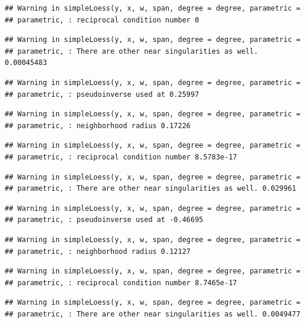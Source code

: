 \documentclass[]{article}
\begin{document}
\begin{verbatim}
## Warning in simpleLoess(y, x, w, span, degree = degree, parametric =
## parametric, : reciprocal condition number 0
\end{verbatim}

\begin{verbatim}
## Warning in simpleLoess(y, x, w, span, degree = degree, parametric =
## parametric, : There are other near singularities as well. 0.00045483
\end{verbatim}

\begin{verbatim}
## Warning in simpleLoess(y, x, w, span, degree = degree, parametric =
## parametric, : pseudoinverse used at 0.25997
\end{verbatim}

\begin{verbatim}
## Warning in simpleLoess(y, x, w, span, degree = degree, parametric =
## parametric, : neighborhood radius 0.17226
\end{verbatim}

\begin{verbatim}
## Warning in simpleLoess(y, x, w, span, degree = degree, parametric =
## parametric, : reciprocal condition number 8.5783e-17
\end{verbatim}

\begin{verbatim}
## Warning in simpleLoess(y, x, w, span, degree = degree, parametric =
## parametric, : There are other near singularities as well. 0.029961
\end{verbatim}

\begin{verbatim}
## Warning in simpleLoess(y, x, w, span, degree = degree, parametric =
## parametric, : pseudoinverse used at -0.46695
\end{verbatim}

\begin{verbatim}
## Warning in simpleLoess(y, x, w, span, degree = degree, parametric =
## parametric, : neighborhood radius 0.12127
\end{verbatim}

\begin{verbatim}
## Warning in simpleLoess(y, x, w, span, degree = degree, parametric =
## parametric, : reciprocal condition number 8.7465e-17
\end{verbatim}

\begin{verbatim}
## Warning in simpleLoess(y, x, w, span, degree = degree, parametric =
## parametric, : There are other near singularities as well. 0.0049477
\end{verbatim}
\end{document}
